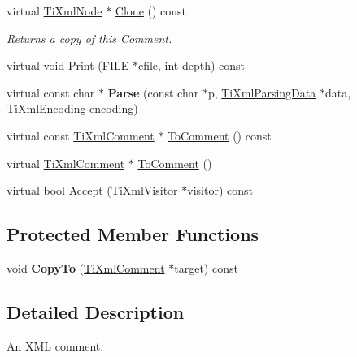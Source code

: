 \begin{DoxyCompactItemize}
\item 
\hypertarget{class_ti_xml_comment_a4f6590c9c9a2b63a48972655b78eb853}{
virtual \hyperlink{class_ti_xml_node}{\-Ti\-Xml\-Node} $\ast$ \hyperlink{class_ti_xml_comment_a4f6590c9c9a2b63a48972655b78eb853}{\-Clone} () const }
\label{class_ti_xml_comment_a4f6590c9c9a2b63a48972655b78eb853}

\begin{DoxyCompactList}\small\item\em \-Returns a copy of this \-Comment. \end{DoxyCompactList}\item 
virtual void \hyperlink{class_ti_xml_comment_a17398061d62c470f57801ce28fa33ad4}{\-Print} (\-F\-I\-L\-E $\ast$cfile, int depth) const 
\item 
\hypertarget{class_ti_xml_comment_a43bddc18ac057734b41d84653b71d3e0}{
virtual const char $\ast$ {\bfseries \-Parse} (const char $\ast$p, \hyperlink{class_ti_xml_parsing_data}{\-Ti\-Xml\-Parsing\-Data} $\ast$data, \-Ti\-Xml\-Encoding encoding)}
\label{class_ti_xml_comment_a43bddc18ac057734b41d84653b71d3e0}

\item 
virtual const \hyperlink{class_ti_xml_comment}{\-Ti\-Xml\-Comment} $\ast$ \hyperlink{class_ti_xml_comment_a00fb4215c20a2399ea05ac9b9e7e68a0}{\-To\-Comment} () const 
\item 
virtual \hyperlink{class_ti_xml_comment}{\-Ti\-Xml\-Comment} $\ast$ \hyperlink{class_ti_xml_comment_acc7c7e07e13c23f17797d642981511df}{\-To\-Comment} ()
\item 
virtual bool \hyperlink{class_ti_xml_comment_a4382de0e50da973f11a23ea5852568bd}{\-Accept} (\hyperlink{class_ti_xml_visitor}{\-Ti\-Xml\-Visitor} $\ast$visitor) const 
\end{DoxyCompactItemize}
\subsection*{\-Protected \-Member \-Functions}
\begin{DoxyCompactItemize}
\item 
\hypertarget{class_ti_xml_comment_a3175b2f27628f4fb7a043897930cd934}{
void {\bfseries \-Copy\-To} (\hyperlink{class_ti_xml_comment}{\-Ti\-Xml\-Comment} $\ast$target) const }
\label{class_ti_xml_comment_a3175b2f27628f4fb7a043897930cd934}

\end{DoxyCompactItemize}


\subsection{\-Detailed \-Description}
\-An \-X\-M\-L comment. 

